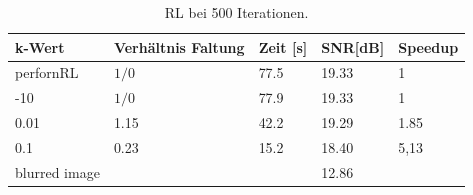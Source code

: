 \documentclass[a4paper,12pt]{article}
\begin{document}
\begin{table}[h]
\begin{center}
\begin{tabular}{ | l | l | l | l | l |}
\hline
k-Wert 				& Verhältnis Faltung	& Zeit [s] 	& SNR[dB] & Speedup \\ \hline
perfornRL		 	&		$1/0$				& 	77.5 	& 19.33   & 	1	\\ \hline
-10				 	&		$1/0$				& 	77.9 	& 19.33   & 	1	\\ \hline
0.01				&		1.15				&	42.2 	& 19.29   &  	1.85\\
0.1					&		0.23				&	15.2 	& 18.40   & 	5,13\\ \hline

blurred image		&		  					& 			&	12.86 & 		\\
\hline
\end{tabular}
\caption{RL bei 500 Iterationen.}
\label{tab:konv_time_SNR_RL_500}
\end{center}
\end{table}
 
\end{document}
